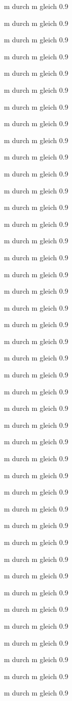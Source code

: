 m durch m gleich 0.9

m durch m gleich 0.9

m durch m gleich 0.9

m durch m gleich 0.9

m durch m gleich 0.9

m durch m gleich 0.9

m durch m gleich 0.9

m durch m gleich 0.9

m durch m gleich 0.9

m durch m gleich 0.9

m durch m gleich 0.9

m durch m gleich 0.9

m durch m gleich 0.9

m durch m gleich 0.9

m durch m gleich 0.9

m durch m gleich 0.9

m durch m gleich 0.9

m durch m gleich 0.9

m durch m gleich 0.9

m durch m gleich 0.9

m durch m gleich 0.9

m durch m gleich 0.9

m durch m gleich 0.9

m durch m gleich 0.9

m durch m gleich 0.9

m durch m gleich 0.9

m durch m gleich 0.9

m durch m gleich 0.9

m durch m gleich 0.9

m durch m gleich 0.9

m durch m gleich 0.9

m durch m gleich 0.9

m durch m gleich 0.9

m durch m gleich 0.9

m durch m gleich 0.9

m durch m gleich 0.9

m durch m gleich 0.9

m durch m gleich 0.9

m durch m gleich 0.9

m durch m gleich 0.9

m durch m gleich 0.9

m durch m gleich 0.9

